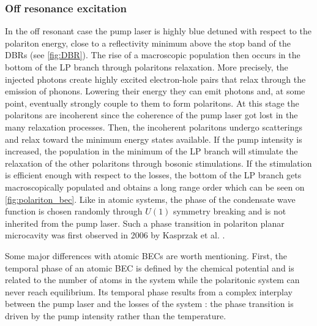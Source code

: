 \subsubsection{Off resonance excitation} In the off resonant case the pump laser is highly blue detuned with respect to the polariton energy, close to a reflectivity minimum above the stop band of the DBRs (see \autoref{fig:DBR}).
The rise of a macroscopic population then occurs in the bottom of the LP branch through polaritons relaxation. More precisely, the injected photons create highly excited electron-hole pairs that relax through the emission of phonons. 
Lowering their energy they can emit photons and, at some point, eventually strongly couple to them to form polaritons. At this stage the polaritons are incoherent since the coherence of the pump laser got lost in the many relaxation processes.
Then, the incoherent polaritons undergo scatterings and relax toward the minimum energy states available. If the pump intensity is increased, the population in the minimum of the LP branch will stimulate the relaxation of the other polaritons through bosonic stimulations.
If the stimulation is efficient enough with respect to the losses, the bottom of the LP branch gets macroscopically populated and obtains a long range order which can be seen on \autoref{fig:polariton_bec}. Like in atomic systems, the phase of the condensate wave function is chosen randomly through $U(1)$ symmetry breaking and is not inherited from the pump laser.
Such a phase transition in polariton planar microcavity was first observed in 2006 by Kasprzak et al. \cite{kasprzak_boseeinstein_2006}. 


Some major differences with atomic BECs are worth mentioning. First, the temporal phase of an atomic BEC is defined by the chemical potential and is related to the number of atoms in the system while 
the polaritonic system can never reach equilibrium. Its temporal phase results from a complex interplay between the pump laser and the losses of the system : the phase transition is driven by the pump intensity rather than the temperature.


